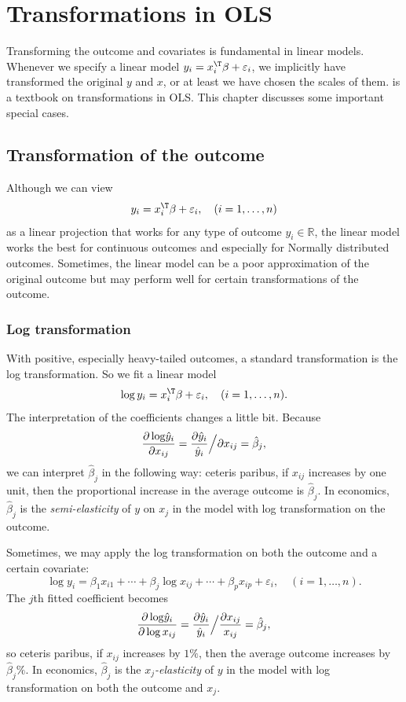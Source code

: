  
\chapter{Transformations in OLS}\label{chapter::transformation}
 
Transforming the outcome and covariates is fundamental in linear models. Whenever we specify a linear model $y_i = x_i^{\T} \beta + \varepsilon_i$, we implicitly have transformed the original $y$ and $x$, or at least we have chosen the scales of them. 
\citet{carroll1988transformation} is a textbook on transformations in OLS.  This chapter discusses some important special cases. 


\section{Transformation of the outcome}

Although we can view
\[
y_{i}=x_{i}^{\T}\beta+\varepsilon_{i},\quad(i=1,\ldots,n)
\]
as a linear projection that works for any type of outcome $y_{i}\in\mathbb{R}$,
the linear model works the best for continuous outcomes and especially
for Normally distributed outcomes. Sometimes, the linear model can be a poor approximation of the original outcome but may perform well for certain transformations of the outcome. 

\subsection{Log transformation}

With positive, especially heavy-tailed outcomes, a standard transformation
is the log transformation. So we fit a linear model
\[
\log y_{i}=x_{i}^{\T}\beta+\varepsilon_{i},\quad(i=1,\ldots,n).
\]
The interpretation of the coefficients changes a little bit. Because
\[
\frac{\text{\ensuremath{\partial\log}}\hat{y}_{i}}{\partial x_{ij}}=\frac{\partial\hat{y}_{i}}{\hat{y}_{i}}\Big/\partial x_{ij}=\hat{\beta}_{j},
\]
we can interpret $\hat{\beta}_{j}$ in the following way: ceteris
paribus, if $x_{ij}$ increases by one unit, then the proportional
increase in the average outcome is $\hat{\beta}_{j}$. In economics, $\hat{\beta}_{j}$ is the {\it semi-elasticity} of $y$ on $x_j$ in the model with log transformation on the outcome. 


Sometimes, we may apply the log transformation on both the outcome and a certain covariate:
$$
\log y_i = \beta_1 x_{i1}  +\cdots + \beta_j \log x_{ij} + \cdots + \beta_p x_{ip} + \varepsilon_i,\quad(i=1,\ldots,n).
$$
The $j$th fitted coefficient becomes
$$
\frac{\text{\ensuremath{\partial\log}}\hat{y}_{i}}{\partial \log x_{ij}} 
= \frac{\partial\hat{y}_{i}}{\hat{y}_{i}}\Big/ \frac{\partial x_{ij}}{x_{ij}}=\hat{\beta}_{j},
$$
so ceteris
paribus, if $x_{ij}$ increases by $1\%$, then   the average outcome increases by $\hat{\beta}_{j} \%$. In economics, $\hat{\beta}_{j}$ is the {\it $x_j$-elasticity} of $y$ in the model with log transformation on both the outcome and $x_{j}$. 


